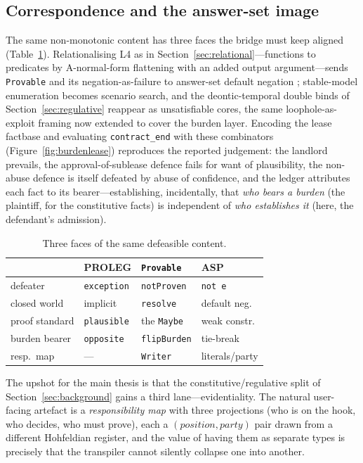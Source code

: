 \documentclass[sigconf,nonacm]{acmart}
\newcommand{\code}[1]{\texttt{\small #1}}
\begin{document}
\subsection{Correspondence and the answer-set image}
The same non-monotonic content has three faces the bridge must keep aligned
(Table~\ref{tab:correspondence}). Relationalising L4 as in
Section~\ref{sec:relational}---functions to predicates by A-normal-form
flattening with an added output argument---sends \code{Provable} and its
negation-as-failure to answer-set default negation
\cite{gelfond1988stable,dung1995argumentation}; stable-model enumeration
becomes scenario search, and the deontic-temporal double binds of
Section~\ref{sec:regulative} reappear as unsatisfiable cores, the same
loophole-as-exploit framing now extended to cover the burden layer.
Encoding the lease factbase and evaluating \code{contract\_end} with these
combinators (Figure~\ref{fig:burdenlease}) reproduces the reported
judgement: the landlord prevails, the
approval-of-sublease defence fails for want of plausibility, the non-abuse
defence is itself defeated by abuse of confidence, and the ledger attributes
each fact to its bearer---establishing, incidentally, that \emph{who bears a
burden} (the plaintiff, for the constitutive facts) is independent of
\emph{who establishes it} (here, the defendant's admission).

\begin{table}[t]
\caption{Three faces of the same defeasible content.}
\label{tab:correspondence}
\small
\begin{tabular}{@{}llll@{}}
\toprule
 & \textbf{PROLEG} & \textbf{\texttt{Provable}} & \textbf{ASP} \\
\midrule
defeater       & \code{exception} & \code{notProven}  & \code{not e} \\
closed world   & implicit         & \code{resolve}    & default neg. \\
proof standard & \code{plausible} & the \code{Maybe}  & weak constr. \\
burden bearer  & \code{opposite}  & \code{flipBurden} & tie-break \\
resp.\ map     & ---              & \code{Writer}     & literals/party \\
\bottomrule
\end{tabular}
\end{table}

The upshot for the main thesis is that the constitutive/regulative split of
Section~\ref{sec:background} gains a third lane---evidentiality. The natural
user-facing artefact is a \emph{responsibility map} with three projections
(who is on the hook, who decides, who must prove), each a
$(\textit{position},\textit{party})$ pair drawn from a different Hohfeldian
register, and the value of having them as separate types is precisely that
the transpiler cannot silently collapse one into another.
\end{document}
